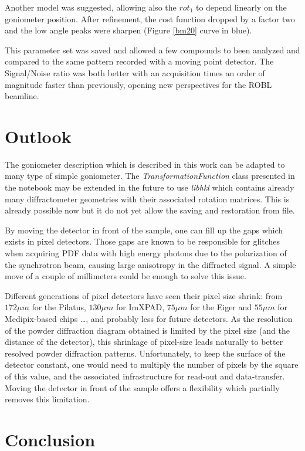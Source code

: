 \documentclass[preprint, pdf]{iucr}              %
\begin{document}
Another model was suggested, allowing also the $rot_1$ to depend linearly on the
goniometer position. 
After refinement, the cost function dropped by a factor two and
the low angle peaks were sharpen (Figure \ref{bm20} curve in blue). 

This parameter set was saved and allowed a few compounds to been analyzed and
compared to the same pattern recorded with a moving point detector. 
The Signal/Noise ratio was both better with an acquisition times an order
of magnitude faster than previously, opening new perspectives for the ROBL
beamline.

\section{Outlook}

The goniometer description which is described in this work can be adapted to
many type of simple goniometer.
The \textit{TransformationFunction} class presented in the notebook may be extended
in the future to use \textit{libhkl}\cite{picca} which contains already many
diffractometer geometries with their associated rotation matrices. 
This is already possible now but it do not yet allow the saving and
restoration from file. 

By moving the detector in front of the sample, one can fill up the
gaps which exists in pixel detectors.
Those gaps are known to be responsible for glitches
when acquiring PDF data with high energy photons due to the
polarization of the synchrotron beam, causing large anisotropy in the
diffracted signal. 
A simple move of a couple of millimeters could be enough to solve this issue. 

Different generations of pixel detectors have seen their pixel size
shrink:
from $172 \mu m$ for the Pilatus, $130 \mu m$ for ImXPAD, $75 \mu m$ for the
Eiger and $55 \mu m$ for Medipix-based chips \ldots, and probably less for
future detectors.
As the resolution of the powder diffraction diagram obtained is limited by the
pixel size (and the distance of the detector), this shrinkage of pixel-size
leads naturally to better resolved powder diffraction patterns. 
Unfortunately, to keep the surface of the detector constant, one would need
to multiply the number of pixels by the square of this value, and the
associated infrastructure for read-out and data-transfer. 
Moving the detector in front of the sample offers a flexibility which
partially removes this limitation.

\section{Conclusion}
\end{document}
